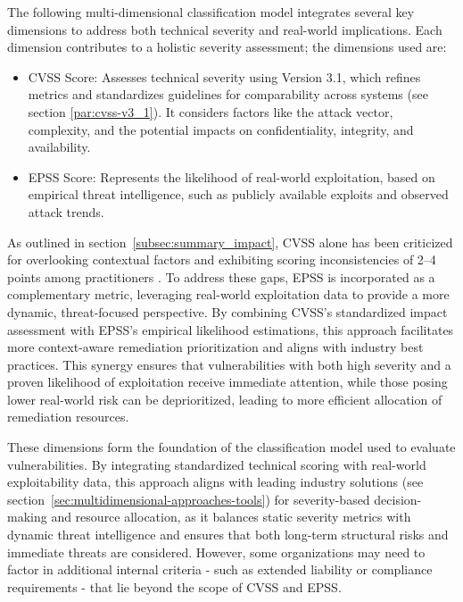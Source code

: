 The following multi-dimensional classification model integrates several key dimensions to address both technical severity and real-world implications. Each dimension contributes to a holistic severity assessment; the dimensions used are:

\begin{itemize}
    \item \ac{CVSS} Score: Assesses technical severity using Version 3.1, which refines metrics and standardizes guidelines for comparability across systems (see section \ref{par:cvss-v3_1}). It considers factors like the attack vector, complexity, and the potential impacts on confidentiality, integrity, and availability.
    \item \ac{EPSS} Score: Represents the likelihood of real-world exploitation, based on empirical threat intelligence, such as publicly available exploits and observed attack trends.
\end{itemize}

As outlined in section~\ref{subsec:summary_impact}, \ac{CVSS} alone has been criticized for overlooking contextual factors and exhibiting scoring inconsistencies of 2--4 points among practitioners \autocite{spring_time_2021}. To address these gaps, \ac{EPSS} is incorporated as a complementary metric, leveraging real-world exploitation data to provide a more dynamic, threat-focused perspective. By combining \ac{CVSS}'s standardized impact assessment with \ac{EPSS}'s empirical likelihood estimations, this approach facilitates more context-aware remediation prioritization and aligns with industry best practices. This synergy ensures that vulnerabilities with both high severity and a proven likelihood of exploitation receive immediate attention, while those posing lower real-world risk can be deprioritized, leading to more efficient allocation of remediation resources.

These dimensions form the foundation of the classification model used to evaluate vulnerabilities. By integrating standardized technical scoring with real-world exploitability data, this approach aligns with leading industry solutions (see section~\ref{sec:multidimensional-approaches-tools}) for severity-based decision-making and resource allocation, as it balances static severity metrics with dynamic threat intelligence and ensures that both long-term structural risks and immediate threats are considered. However, some organizations may need to factor in additional internal criteria - such as extended liability or compliance requirements - that lie beyond the scope of \ac{CVSS} and \ac{EPSS}.

